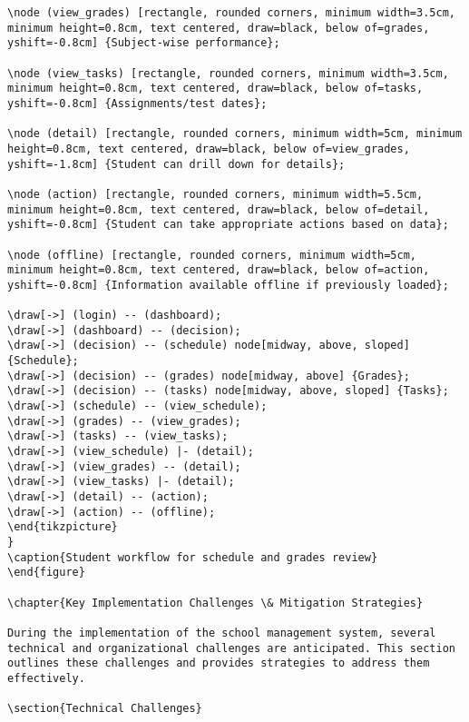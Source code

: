 \documentclass[11pt]{report}
\begin{document}
\begin{verbatim}
\node (view_grades) [rectangle, rounded corners, minimum width=3.5cm, minimum height=0.8cm, text centered, draw=black, below of=grades, yshift=-0.8cm] {Subject-wise performance};

\node (view_tasks) [rectangle, rounded corners, minimum width=3.5cm, minimum height=0.8cm, text centered, draw=black, below of=tasks, yshift=-0.8cm] {Assignments/test dates};

\node (detail) [rectangle, rounded corners, minimum width=5cm, minimum height=0.8cm, text centered, draw=black, below of=view_grades, yshift=-1.8cm] {Student can drill down for details};

\node (action) [rectangle, rounded corners, minimum width=5.5cm, minimum height=0.8cm, text centered, draw=black, below of=detail, yshift=-0.8cm] {Student can take appropriate actions based on data};

\node (offline) [rectangle, rounded corners, minimum width=5cm, minimum height=0.8cm, text centered, draw=black, below of=action, yshift=-0.8cm] {Information available offline if previously loaded};

\draw[->] (login) -- (dashboard);
\draw[->] (dashboard) -- (decision);
\draw[->] (decision) -- (schedule) node[midway, above, sloped] {Schedule};
\draw[->] (decision) -- (grades) node[midway, above] {Grades};
\draw[->] (decision) -- (tasks) node[midway, above, sloped] {Tasks};
\draw[->] (schedule) -- (view_schedule);
\draw[->] (grades) -- (view_grades);
\draw[->] (tasks) -- (view_tasks);
\draw[->] (view_schedule) |- (detail);
\draw[->] (view_grades) -- (detail);
\draw[->] (view_tasks) |- (detail);
\draw[->] (detail) -- (action);
\draw[->] (action) -- (offline);
\end{tikzpicture}
}
\caption{Student workflow for schedule and grades review}
\end{figure}

\chapter{Key Implementation Challenges \& Mitigation Strategies}

During the implementation of the school management system, several technical and organizational challenges are anticipated. This section outlines these challenges and provides strategies to address them effectively.

\section{Technical Challenges}


\end{verbatim}
\end{document}

